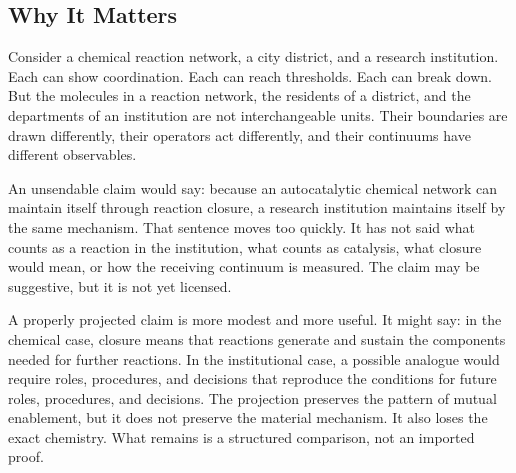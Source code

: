 \documentclass[11pt,a4paper,openany]{book}
\begin{document}
\subsection{Why It Matters}
Consider a chemical reaction network, a city district, and a research institution. Each can show coordination. Each can reach thresholds. Each can break down. But the molecules in a reaction network, the residents of a district, and the departments of an institution are not interchangeable units. Their boundaries are drawn differently, their operators act differently, and their continuums have different observables. \cite{haken_synergetics,nicolis_prigogine_selforg}\par
An unsendable claim would say: because an autocatalytic chemical network can maintain itself through reaction closure, a research institution maintains itself by the same mechanism. That sentence moves too quickly. It has not said what counts as a reaction in the institution, what counts as catalysis, what closure would mean, or how the receiving continuum is measured. The claim may be suggestive, but it is not yet licensed.\par
A properly projected claim is more modest and more useful. It might say: in the chemical case, closure means that reactions generate and sustain the components needed for further reactions. In the institutional case, a possible analogue would require roles, procedures, and decisions that reproduce the conditions for future roles, procedures, and decisions. The projection preserves the pattern of mutual enablement, but it does not preserve the material mechanism. It also loses the exact chemistry. What remains is a structured comparison, not an imported proof.\par
\end{document}
